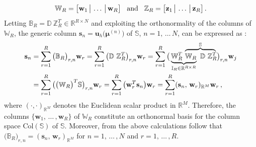 \documentclass[12pt, a4paper, twoside, openright, notitlepage]{report}
\numberwithin{equation}{chapter}
\theoremstyle{theorem}
\theoremstyle{definition}
\theoremstyle{remark}
\theoremstyle{proposition}
\numberwithin{figure}{chapter}
\newcommand{\bg}[1]{\boldsymbol{#1}}
\begin{document}
		\begin{equation}
			\label{eq:svd-compact-matrices}
			\mathbb{W}_R = \big[ \mathbf{w}_1 \, \big| \, \ldots \, \big| \, \mathbf{w}_R \big] \hspace*{0.3cm} \text{and} \hspace*{0.3cm} \mathbb{Z}_R = \big[ \mathbf{z}_1 \, \big| \, \ldots \, \big| \, \mathbf{z}_R \big] \, .
		\end{equation}
		Letting $\mathbb{B}_R = \mathbb{D} ~ \mathbb{Z}_R^T \in \mathbb{R}^{R \times N}$ and exploiting the orthonormality of the columns of $\mathbb{W}_R$, the generic column $\mathbf{s}_n = \mathbf{u}_h \big( \bg{\mu}^{(n)} \big)$ of $\mathbb{S}$, $n = 1, \, \ldots \, N$, can be expressed as \cite{Vol08}:
		\begin{equation*}
			\begin{aligned}
				\mathbf{s}_n & = \sum_{r = 1}^R \big( \mathbb{B}_R \big)_{r,n} \mathbf{w}_r = \sum_{r = 1}^R \big( \mathbb{D} ~ \mathbb{Z}_R^T \big)_{r,n} \mathbf{w}_r = \sum_{r = 1}^R \big( \underbrace{ \mathbb{W}_R^T ~ \lefteqn{\overbrace{\phantom{\mathbb{W}_R ~ \mathbb{D} ~ \mathbb{Z}_R^T}}^{\mathbb{S}}} \mathbb{W}_R}_{\mathbb{I}_R \in \mathbb{R}^{R \times R}} ~ \mathbb{D} ~ \mathbb{Z}_R^T \big)_{r,n} \mathbf{w}_j \\
				& = \sum_{r = 1}^R \big( \big( \mathbb{W}_R \big)^T \mathbb{S} \big)_{r,n} \mathbf{w}_r = \sum_{r = 1}^R \big( \mathbf{w}_r^T \mathbf{s}_n \big) \mathbf{w}_r = \sum_{r = 1}^R (\mathbf{s}_n, \, \mathbf{w}_r)_{\mathbb{R}^M} \mathbf{w}_r \, ,
			\end{aligned}
		\end{equation*}
		where $(\cdot,\cdot)_{\mathbb{R}^M}$ denotes the Euclidean scalar product in $\mathbb{R}^M$. Therefore, the columns $\big\lbrace \mathbf{w}_1, \, \ldots \, , \mathbf{w}_R \big\rbrace$ of $\mathbb{W}_R$ constitute an orthonormal basis for the column space $\text{Col}(\mathbb{S})$ of $\mathbb{S}$. Moreover, from the above calculations follow that $\big( \mathbb{B}_R \big)_{r,n} = (\mathbf{s}_n, \, \mathbf{w}_r)_{\mathbb{R}^M}$ for $n = 1, \, \ldots \, , N$ and $r = 1, \, \ldots \, , R$.
		
\end{document}
